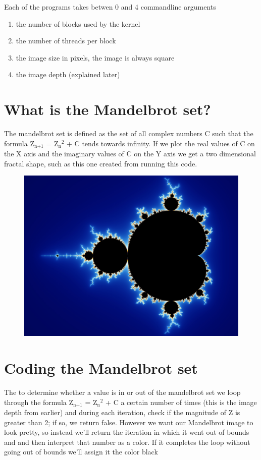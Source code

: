 \documentclass[letterpaper,10pt,openany,oneside]{sphinxmanual}
\begin{document}
Each of the programs takes betwen 0 and 4 commandline arguments
\begin{enumerate}
\item {} 
the number of blocks used by the kernel

\item {} 
the number of threads per block

\item {} 
the image size in pixels, the image is always square

\item {} 
the image depth (explained later)

\end{enumerate}


\section{What is the Mandelbrot set?}
\label{1-Mandelbrot/Mandelbrot:what-is-the-mandelbrot-set}
The mandelbrot set is defined as the set of all complex numbers C
such that the formula Z$_{\text{n+1}}$ = Z$_{\text{n}}$$^{\text{2}}$ + C
tends towards infinity. If we plot the real values of C on the X
axis and the imaginary values of C on the Y axis we get a two
dimensional fractal shape, such as this one created from running this code.
\begin{figure}[htbp]
\centering

\includegraphics{set.jpg}
\end{figure}


\section{Coding the Mandelbrot set}
\label{1-Mandelbrot/Mandelbrot:coding-the-mandelbrot-set}
The to determine whether a value is in or out of the mandelbrot
set we loop through the formula  Z$_{\text{n+1}}$ = Z$_{\text{n}}$$^{\text{2}}$ + C a certain number of times (this is the image depth
from earlier) and during each iteration, check if the magnitude
of Z is greater than 2; if so, we return false. However we want our
Mandelbrot image to look pretty, so instead we'll return the
iteration in which it went out of bounds and and then interpret
that number as a color. If it completes the loop without going
out of bounds we'll assign it the color black
\end{document}
